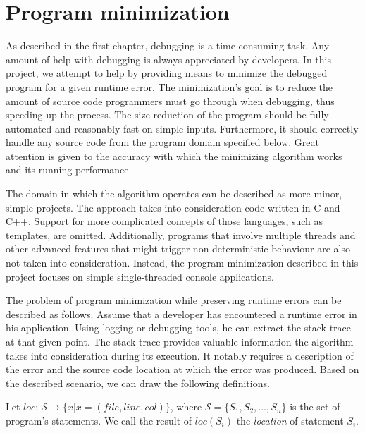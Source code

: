 \chapter{Program minimization}

As described in the first chapter, debugging is a time-consuming task.
Any amount of help with debugging is always appreciated by developers.
In this project, we attempt to help by providing means to minimize the 
debugged program for a given runtime error.
The minimization's goal is to reduce the amount of source code programmers 
must go through when debugging, thus speeding up the process.
The size reduction of the program should be fully automated and reasonably 
fast on simple inputs.
Furthermore, it should correctly handle any source code from the program 
domain specified below.
Great attention is given to the accuracy with which the minimizing algorithm 
works and its running performance.


The domain in which the algorithm operates can be described as more minor, 
simple projects.
The approach takes into consideration code written in C and C++.
Support for more complicated concepts of those languages, such as templates,
are omitted.
Additionally, programs that involve multiple threads and other advanced
features that might trigger non-deterministic behaviour are also not taken 
into consideration.
Instead, the program minimization described in this project focuses 
on simple single-threaded console applications.

The problem of program minimization while preserving runtime errors can be 
described as follows.
Assume that a developer has encountered a runtime error in his application.
Using logging or debugging tools, he can extract the stack trace at that 
given point.
The stack trace provides valuable information the algorithm takes into 
consideration during its execution.
It notably requires a description of the error and the source code 
location at which the error was produced.
Based on the described scenario, we can draw the following definitions.

\begin{defn}[Location]\label{def04:1}
  Let $loc$: $\mathcal{S} \mapsto \{x | x = (file, line, col)\}$, 
  where $\mathcal{S} = \{S_1, S_2, \ldots, S_n\}$ 
  is the set of program's statements.
  We call the result of $loc(S_i)$ the \emph{location} of statement $S_i$.
\end{defn}


